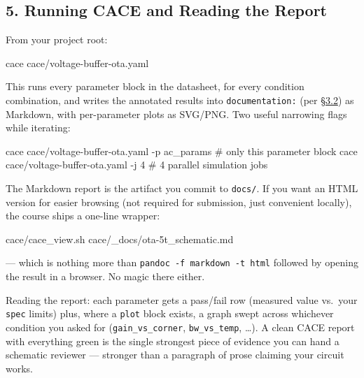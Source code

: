 \documentclass[
]{article}
\newenvironment{Shaded}{}{}
\newcommand{\ExtensionTok}[1]{#1}
\newcommand{\NormalTok}[1]{#1}
\begin{document}
\hypertarget{running-cace-and-reading-the-report}{%
\subsection{5. Running CACE and Reading the
Report}\label{running-cace-and-reading-the-report}}

From your project root:

\begin{Shaded}
\begin{Highlighting}[]
\ExtensionTok{cace}\NormalTok{ cace/voltage{-}buffer{-}ota.yaml}
\end{Highlighting}
\end{Shaded}

This runs every parameter block in the datasheet, for every condition
combination, and writes the annotated results into
\texttt{documentation:} (per \protect\hyperlink{32-paths}{§3.2}) as
Markdown, with per-parameter plots as SVG/PNG. Two useful narrowing
flags while iterating:

\begin{Shaded}
\begin{Highlighting}[]
\ExtensionTok{cace}\NormalTok{ cace/voltage{-}buffer{-}ota.yaml {-}p ac\_params        \# only this parameter block}
\ExtensionTok{cace}\NormalTok{ cace/voltage{-}buffer{-}ota.yaml {-}j 4                \# 4 parallel simulation jobs}
\end{Highlighting}
\end{Shaded}

The Markdown report is the artifact you commit to \texttt{docs/}. If you
want an HTML version for easier browsing (not required for submission,
just convenient locally), the course ships a one-line wrapper:

\begin{Shaded}
\begin{Highlighting}[]
\ExtensionTok{cace/cace\_view.sh}\NormalTok{ cace/\_docs/ota{-}5t\_schematic.md}
\end{Highlighting}
\end{Shaded}

--- which is nothing more than \texttt{pandoc\ -f\ markdown\ -t\ html}
followed by opening the result in a browser. No magic there either.

Reading the report: each parameter gets a pass/fail row (measured value
vs.~your \texttt{spec} limits) plus, where a \texttt{plot} block exists,
a graph swept across whichever condition you asked for
(\texttt{gain\_vs\_corner}, \texttt{bw\_vs\_temp}, \ldots). A clean CACE
report with everything green is the single strongest piece of evidence
you can hand a schematic reviewer --- stronger than a paragraph of prose
claiming your circuit works.
\end{document}
